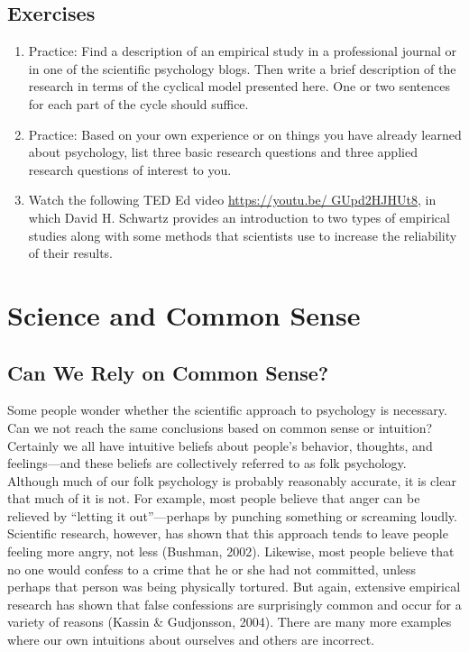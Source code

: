 \documentclass[]{book}
\theoremstyle{definition}
\theoremstyle{definition}
\theoremstyle{remark}
\begin{document}
\subsection{Exercises}\label{exercises-1}

\begin{enumerate}
\def\labelenumi{\arabic{enumi}.}
\item
  Practice: Find a description of an empirical study in a professional
  journal or in one of the scientific psychology blogs. Then write a
  brief description of the research in terms of the cyclical model
  presented here. One or two sentences for each part of the cycle should
  suffice.
\item
  Practice: Based on your own experience or on things you have already
  learned about psychology, list three basic research questions and
  three applied research questions of interest to you.
\item
  Watch the following TED Ed video
  \href{https://youtu.be/\%20GUpd2HJHUt8}{https://youtu.be/
  GUpd2HJHUt8}, in which David H. Schwartz provides an introduction to
  two types of empirical studies along with some methods that scientists
  use to increase the reliability of their results.
\end{enumerate}

\section{Science and Common Sense}\label{science-and-common-sense}

\subsection{Can We Rely on Common
Sense?}\label{can-we-rely-on-common-sense}

Some people wonder whether the scientific approach to psychology is
necessary. Can we not reach the same conclusions based on common sense
or intuition? Certainly we all have intuitive beliefs about people's
behavior, thoughts, and feelings---and these beliefs are collectively
referred to as folk psychology. Although much of our folk psychology is
probably reasonably accurate, it is clear that much of it is not. For
example, most people believe that anger can be relieved by ``letting it
out''---perhaps by punching something or screaming loudly. Scientific
research, however, has shown that this approach tends to leave people
feeling more angry, not less (Bushman, 2002). Likewise, most people
believe that no one would confess to a crime that he or she had not
committed, unless perhaps that person was being physically tortured. But
again, extensive empirical research has shown that false confessions are
surprisingly common and occur for a variety of reasons (Kassin \&
Gudjonsson, 2004). There are many more examples where our own intuitions
about ourselves and others are incorrect.
\end{document}
